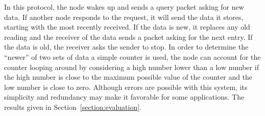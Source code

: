 In this protocol, the node wakes up and sends
a query packet asking for new data.  If another node responds to the request, it will send the data it stores, starting
with the most recently received.  If the data is new, it replaces any old reading and the receiver of the data sends a
packet asking for the next entry.  If the data is old, the receiver asks the sender to stop.  In order to determine the
``newer'' of two sets of data a simple counter is used, the node can account for the counter looping around by considering
a high number lower than a low number if the high number is close to the maximum possible value of the counter and the
low number is close to zero.  Although errors are possible with this system, its simplicity and redundancy may make it
favorable for some applications.  The results given in Section~\ref{section:evaluation}.
